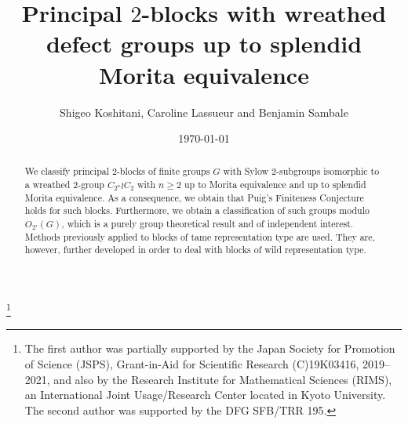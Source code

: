 \documentclass[12pt,a4paper]{amsart}
\theoremstyle{plain}\newtheorem{Theorem}{Theorem}[section]
\theoremstyle{plain}\newtheorem{Conjecture}[Theorem]{Conjecture}
\theoremstyle{plain}\newtheorem{Corollary}[Theorem]{Corollary}
\theoremstyle{plain}\newtheorem{Lemma}[Theorem]{Lemma}
\theoremstyle{plain}\newtheorem{Proposition}[Theorem]{Proposition}
\theoremstyle{definition}\newtheorem{Definition}[Theorem]{Definition}
\theoremstyle{definition}\newtheorem{Example}[Theorem]{Example}
\theoremstyle{definition}\newtheorem{Examples}[Theorem]{Examples}
\theoremstyle{definition}\newtheorem{Remark}[Theorem]{Remark}
\theoremstyle{definition}\newtheorem{Question}[Theorem]{Question}
\theoremstyle{definition}\newtheorem{Notation}[Theorem]{Notation}
\theoremstyle{definition}\newtheorem{Hypothesis}[Theorem]{Hypothesis}
\theoremstyle{definition}\newtheorem{Assumption}[Theorem]{Assumption}
\theoremstyle{definition}\newtheorem{Strategy}[Theorem]{Strategy}
\theoremstyle{definition}\newtheorem{Contents}[Theorem]{Contents}
\theoremstyle{definition}\newtheorem{Computations}[Theorem]{Computations}
\theoremstyle{definition}\newtheorem{Equivalences}[Theorem]{Equivalences}
\theoremstyle{definition}\newtheorem{Notation/Definition}[Theorem]{Notation/Definition}
\theoremstyle{definition}\newtheorem{noth}[Theorem]{}
\theoremstyle{plain}\newtheorem{Step}[Theorem]{Step}
\begin{document}
\title[Principal $2$-blocks with wreathed defect groups up to splendid Morita equivalence]
{Principal $2$-blocks with wreathed defect groups up to splendid Morita equivalence}\date{\today}
\author{Shigeo Koshitani, Caroline Lassueur and Benjamin Sambale} 


\address{S. Koshitani, Department of Mathematics and Informatics,
Graduate School of Science, Chiba
University, 1-33 Yayoi-cho, Inage-ku,Chiba 263-8522, Japan}
%
\address{C. Lassueur, 
Institut f{\"u}r Algebra, Zahlentheorie und Diskrete Mathematik, Leibniz
Universit{\"a}t Hannover, Welfengarten 1, D-30167 Hannover
Germany}
%
\address{B. Sambale, Institut f{\"u}r Algebra, Zahlentheorie und Diskrete Mathematik, Leibniz
Universit{\"a}t Hannover, Welfengarten 1, D-30167 Hannover, Germany} 
%
\thanks{The first author
was partially supported by the Japan Society for Promotion of Science (JSPS),
Grant-in-Aid for Scientific Research (C)19K03416, 2019--2021, 
and also by the Research Institute for Mathematical Sciences (RIMS),
an International Joint Usage/Research Center located in Kyoto University.
The second author
was supported by the DFG SFB/TRR 195.} 
%
%

 
\begin{abstract} 
We classify principal $2$-blocks of finite groups $G$ with Sylow $2$-subgroups isomorphic 
to a wreathed $2$-group $C_{2^n}\wr C_2$ with $n\geq 2$ up to Morita equivalence  and 
up to splendid Morita equivalence. As a consequence,  we obtain 
that Puig's Finiteness Conjecture holds for such blocks.
Furthermore, we obtain a classification of such groups modulo $O_{2'}(G)$, 
which is a purely group theoretical result and of independent interest. 
Methods previously applied to blocks of tame representation type are used. They are, however, further
developed in order to deal with blocks of wild representation type.
 \end{abstract}
\end{document}
